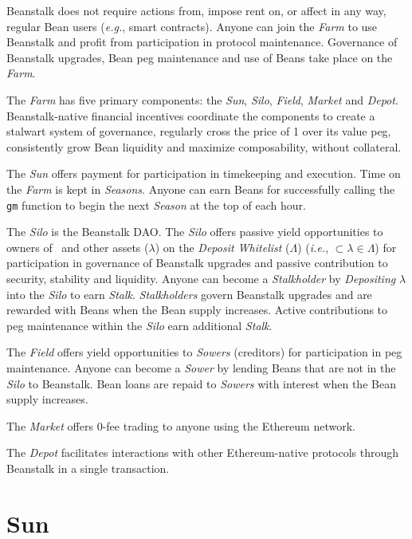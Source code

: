 \documentclass[tikz]{article}
\newcommand{\code}[1]{\texttt{#1}}
\newcommand{\term}[1]{\textsl{#1}}
\newcommand{\Bean}{} %
\begin{document}
Beanstalk does not require actions from, impose rent on, or affect in any way, regular Bean users (\term{e.g.}, smart contracts). Anyone can join the \term{Farm} to use Beanstalk and profit from participation in protocol maintenance. Governance of Beanstalk upgrades, Bean peg maintenance and use of Beans take place on the \term{Farm}.

The \term{Farm} has five primary components: the \term{Sun}, \term{Silo}, \term{Field}, \term{Market} and \term{Depot}. Beanstalk-native financial incentives coordinate the components to create a stalwart system of governance, regularly cross the price of \Bean1 over its value peg, consistently grow Bean liquidity and maximize composability, without collateral.

The \term{Sun} offers payment for participation in timekeeping and execution. Time on the \term{Farm} is kept in \term{Seasons}. Anyone can earn Beans for successfully calling the \code{gm} function to begin the next \term{Season} at the top of each hour.

The \term{Silo} is the Beanstalk DAO. The \term{Silo} offers passive yield opportunities to owners of \Bean\ and other assets (\hyperlink{ht126}{$\lambda$}) on the \term{Deposit Whitelist} (\hyperlink{ht127}{$\Lambda$}) (\term{i.e.}, $\Bean \subset \lambda \in \Lambda$) for participation in governance of Beanstalk upgrades and passive contribution to security, stability and liquidity. Anyone can become a \term{Stalkholder} by \term{Depositing} \hyperlink{ht126}{$\lambda$} into the \term{Silo} to earn \term{Stalk}. \term{Stalkholders} govern Beanstalk upgrades and are rewarded with Beans when the Bean supply increases. Active contributions to peg maintenance within the \term{Silo} earn additional \term{Stalk}.

The \term{Field} offers yield opportunities to \term{Sowers} (creditors) for participation in peg maintenance. Anyone can become a \term{Sower} by lending Beans that are not in the \term{Silo} to Beanstalk. Bean loans are repaid to \term{Sowers} with interest when the Bean supply increases. 

The \term{Market} offers 0-fee trading to anyone using the Ethereum network.

The \term{Depot} facilitates interactions with other Ethereum-native protocols through Beanstalk in a single transaction.


\section{Sun}
\end{document}
